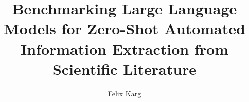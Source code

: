 \usepackage{graphicx}
\usepackage[export]{adjustbox}
\usepackage{multicol}
\usepackage{bibentry}
\usepackage{subcaption}
\usepackage{pdfpcnotes}

\usepackage{xcolor}
\usepackage{caption}
\usepackage[font={small,color=ocre},labelformat=empty]{caption}

\usepackage{csquotes}
\usepackage[acronym,toc,nopostdot]{glossaries}
\makeglossaries


\usepackage{tikz}


\def\signed #1{{\leavevmode\unskip\nobreak\hfil\penalty50\hskip1em
  \hbox{}\nobreak\hfill #1%
  \parfillskip=0pt \finalhyphendemerits=0 \endgraf}}

\newsavebox\mybox
\newenvironment{aquote}[1]
  {\savebox\mybox{#1}\begin{quote}\openautoquote\hspace*{-.7ex}}
  {\unskip\closeautoquote\vspace*{1mm}\signed{\usebox\mybox}\end{quote}}





\newcommand{\gray}[1]{
    \textcolor[gray]{0.65}{#1}
}

\usepackage{xspace}
\newcommand{\ttime}{\texttt{time}\xspace}
\newcommand{\ttemp}{\texttt{temperature}\xspace}
\newcommand{\tadd}{\texttt{additive}\xspace}
\newcommand{\tsolv}{\texttt{solvent}\xspace}
\newcommand{\cid}{\texttt{cid}\xspace}

\newcommand{\mpy}[1]{\texttt{#1}}





\title[Benchmarking Large Language Models for Information Extraction]{Benchmarking Large Language Models for Zero-Shot Automated Information Extraction from Scientific Literature}
\author[Felix Karg]{Felix Karg}

